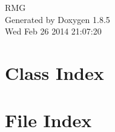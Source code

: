 \documentclass[twoside]{book}
\newcommand{\clearemptydoublepage}{%
  \newpage{\pagestyle{empty}\cleardoublepage}%
}
\begin{document}
\hypersetup{pageanchor=false}
\begin{titlepage}
\vspace*{7cm}
\begin{center}%
{\Large R\-M\-G }\\
\vspace*{1cm}
{\large Generated by Doxygen 1.8.5}\\
\vspace*{0.5cm}
{\small Wed Feb 26 2014 21:07:20}\\
\end{center}
\end{titlepage}
\clearemptydoublepage
\tableofcontents
\clearemptydoublepage
{}
\hypersetup{pageanchor=true}

\chapter{Class Index}

\chapter{File Index}

\end{document}
